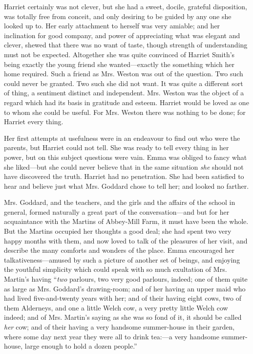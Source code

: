 Harriet certainly was not clever, but she had a sweet, docile, grateful disposition, was totally free from conceit, and only desiring to be guided by any one she looked up to. Her early attachment to herself was very amiable; and her inclination for good company, and power of appreciating what was elegant and clever, shewed that there was no want of taste, though strength of understanding must not be expected. Altogether she was quite convinced of Harriet Smith's being exactly the young friend she wanted---exactly the something which her home required. Such a friend as Mrs. Weston was out of the question. Two such could never be granted. Two such she did not want. It was quite a different sort of thing, a sentiment distinct and independent. Mrs. Weston was the object of a regard which had its basis in gratitude and esteem. Harriet would be loved as one to whom she could be useful. For Mrs. Weston there was nothing to be done; for Harriet every thing.

Her first attempts at usefulness were in an endeavour to find out who were the parents, but Harriet could not tell. She was ready to tell every thing in her power, but on this subject questions were vain. Emma was obliged to fancy what she liked---but she could never believe that in the same situation {\em she} should not have discovered the truth. Harriet had no penetration. She had been satisfied to hear and believe just what Mrs. Goddard chose to tell her; and looked no farther.

Mrs. Goddard, and the teachers, and the girls and the affairs of the school in general, formed naturally a great part of the conversation---and but for her acquaintance with the Martins of Abbey-Mill Farm, it must have been the whole. But the Martins occupied her thoughts a good deal; she had spent two very happy months with them, and now loved to talk of the pleasures of her visit, and describe the many comforts and wonders of the place. Emma encouraged her talkativeness---amused by such a picture of another set of beings, and enjoying the youthful simplicity which could speak with so much exultation of Mrs. Martin's having “{\em two} parlours, two very good parlours, indeed; one of them quite as large as Mrs. Goddard's drawing-room; and of her having an upper maid who had lived five-and-twenty years with her; and of their having eight cows, two of them Alderneys, and one a little Welch cow, a very pretty little Welch cow indeed; and of Mrs. Martin's saying as she was so fond of it, it should be called {\em her} cow; and of their having a very handsome summer-house in their garden, where some day next year they were all to drink tea:---a very handsome summer-house, large enough to hold a dozen people.”

